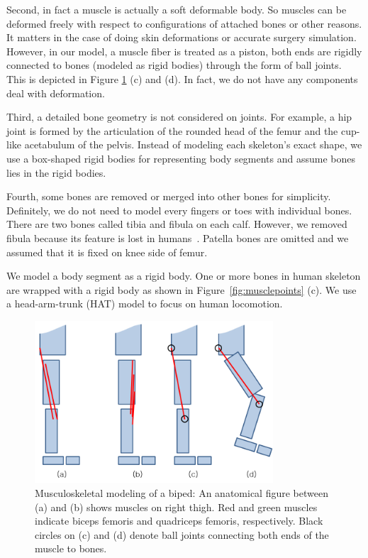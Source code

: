 \documentclass[master,english,final]{kaist-ucs}
\begin{document}
Second, in fact a muscle is actually a soft deformable body.
So muscles can be deformed freely
with respect to configurations of attached bones or other reasons. It matters
in the case of doing skin deformations or accurate surgery simulation. However, in our model,
a muscle fiber is treated as a piston, both ends are rigidly connected to bones (modeled as rigid bodies)
through the form of ball joints. This is depicted in Figure \ref{muscleabs} (c) and (d).
In fact, we do not have any components deal with deformation.

Third, a detailed bone geometry is not considered on joints.
For example, a hip joint is formed by the articulation of the rounded head of the femur and
the cup-like acetabulum of the pelvis. Instead of modeling each skeleton's exact shape,
we use a box-shaped rigid bodies for representing body segments and assume bones lies
in the rigid bodies.

Fourth, some bones are removed or merged into other bones for simplicity.
Definitely, we do not need to model every fingers or toes with individual bones.
There are two bones called tibia and fibula on each calf.
However, we removed fibula because its feature is lost in humans~\cite{nofibula}.
Patella bones are omitted and we assumed that it is fixed on knee side of femur.

We model a body segment as a rigid body. One or more bones in human skeleton are
wrapped with a rigid body as shown in Figure~\ref{fig:musclepoints} (c).
We use a head-arm-trunk (HAT) model to focus on human locomotion.


\begin{figure}[h!]
  \centering
  \includegraphics[width=3.5in]{muscleabs}
  \caption[Musculoskeletal modeling of a biped]{Musculoskeletal modeling of a biped:
  An anatomical figure between (a) and (b) shows muscles on right thigh.
  Red and green muscles indicate biceps femoris and quadriceps femoris, respectively. Black circles on
  (c) and (d) denote ball joints connecting both ends of the muscle to bones.}
  \label{muscleabs}
\end{figure}
\end{document}
